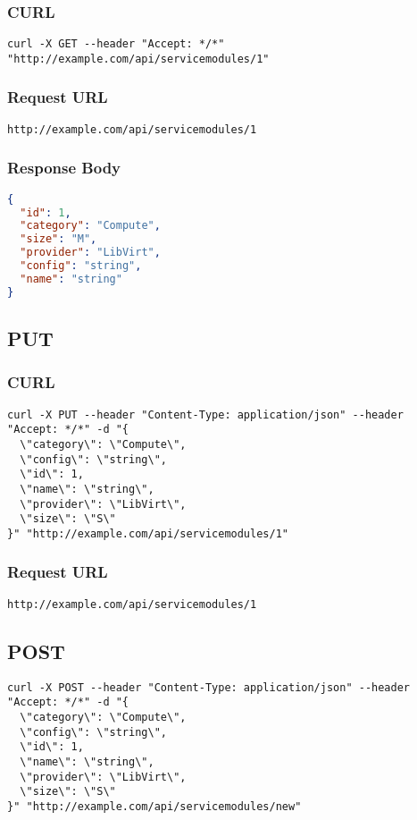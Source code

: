 \subsubsection{CURL}
\begin{lstlisting}[] 
curl -X GET --header "Accept: */*" "http://example.com/api/servicemodules/1"
\end{lstlisting}


\subsubsection{Request URL}
\begin{lstlisting}[] 
http://example.com/api/servicemodules/1
\end{lstlisting}


\subsubsection{Response Body}
\begin{lstlisting}[language=json] 
{
  "id": 1,
  "category": "Compute",
  "size": "M",
  "provider": "LibVirt",
  "config": "string",
  "name": "string"
}
\end{lstlisting}


\subsection{PUT}
\subsubsection{CURL}
\begin{lstlisting}[] 
curl -X PUT --header "Content-Type: application/json" --header "Accept: */*" -d "{
  \"category\": \"Compute\",
  \"config\": \"string\",
  \"id\": 1,
  \"name\": \"string\",
  \"provider\": \"LibVirt\",
  \"size\": \"S\"
}" "http://example.com/api/servicemodules/1"
\end{lstlisting}


\subsubsection{Request URL}
\begin{lstlisting}[] 
http://example.com/api/servicemodules/1
\end{lstlisting}

\subsection{POST}
\begin{lstlisting}[] 
curl -X POST --header "Content-Type: application/json" --header "Accept: */*" -d "{
  \"category\": \"Compute\",
  \"config\": \"string\",
  \"id\": 1,
  \"name\": \"string\",
  \"provider\": \"LibVirt\",
  \"size\": \"S\"
}" "http://example.com/api/servicemodules/new"
\end{lstlisting}


